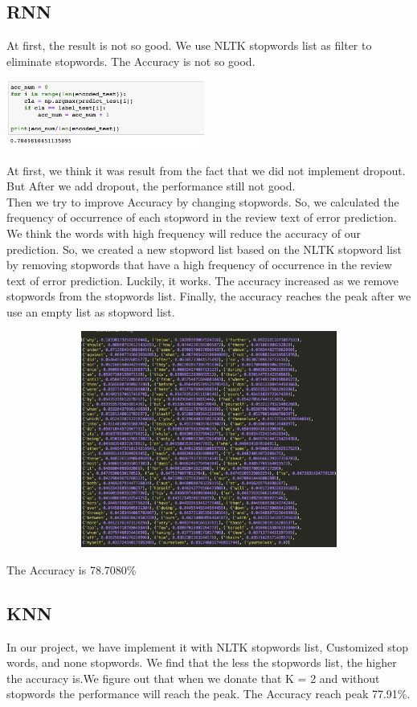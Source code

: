 \documentclass{article}
\begin{document}
\subsection{RNN}
At first, the result is not so good. We use NLTK stopwords list as filter to eliminate stopwords. The Accuracy is not so good.

\includegraphics[width=6.5cm]{RNN_bad.png}

At first, we think it was result from the fact that we did not implement dropout. But After we add dropout, the performance still not good.\\
Then we try to improve Accuracy by changing stopwords. So, we calculated the frequency of occurrence of each stopword in the review text of error prediction. We think the words with high frequency will reduce the accuracy of our prediction. So, we created a new stopword list based on the NLTK stopword list by removing stopwords that have a high frequency of occurrence in the review text of error prediction. Luckily, it works. The accuracy increased as we remove stopwords from the stopwords list. Finally, the accuracy reaches the peak after we use an empty list as stopword list.


\includegraphics[width = 6.0in, height = 2.8in]{stopwords.png}

The Accuracy is 78.7080\%

\subsection{KNN}
In our project, we have implement it with NLTK stopwords list, Customized stop words, and none stopwords. We find that the less the stopwords list, the higher the accuracy is.We figure out that when we donate that K = 2 and without stopwords the performance will reach the peak. The Accuracy reach peak 77.91\%.
\end{document}
